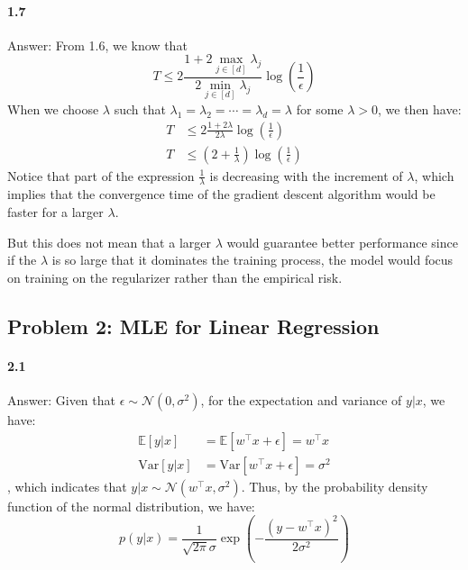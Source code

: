 \documentclass[11pt]{article}
\begin{document}
\paragraph{1.7}
Answer:
\newline
From 1.6, we know that
\begin{equation}
    T \leq 2\frac{1+2\max_{j\in[d]}\lambda_j}{2\min_{j\in[d]}{\lambda_j}}\log{(\frac{1}{\epsilon})}
\end{equation}
When we choose $\lambda$ such that $\lambda_1 = \lambda_2= \cdots =\lambda_d=\lambda$ for some $\lambda>0$, we then have:
\begin{equation}
    \begin{split}
        T&\leq 2\frac{1+2\lambda}{2\lambda}\log{(\frac{1}{\epsilon})} \\ 
        T&\leq (2+\frac{1}{\lambda})\log{(\frac{1}{\epsilon})}
    \end{split}
\end{equation}
Notice that part of the expression $\frac{1}{\lambda}$ is decreasing with the increment of $ \lambda$, which implies that the convergence time of the gradient descent algorithm would be faster for a larger $\lambda$.

But this does not mean that a larger $\lambda$ would guarantee better performance since if the $\lambda$ is so large that it dominates the training process, the model would focus on training on the regularizer rather than the empirical risk.

\subsection*{\Large Problem 2: MLE for Linear Regression}
\paragraph{2.1}
Answer:
\newline
Given that $\epsilon \sim \mathcal{N}(0, \sigma^2)$, for the expectation and variance of $y|x$, we have:
\begin{equation}
    \begin{split}
        \mathbb{E}[y|x] &= \mathbb{E}[w^\top x+\epsilon]=w^\top x\\
        \text{Var}[y|x]&=  \text{Var}[w^\top x+\epsilon] =\sigma^2
    \end{split}
\end{equation}
, which indicates that $y|x\sim \mathcal{N}(w^\top x, \sigma^2)$. Thus, by the probability density function of the normal distribution, we have:
\begin{equation}
    p(y|x) = \frac{1}{\sqrt{2\pi}\sigma}\exp{(-\frac{(y-w^\top x)^2}{2\sigma^2})}
\end{equation}
\end{document}
